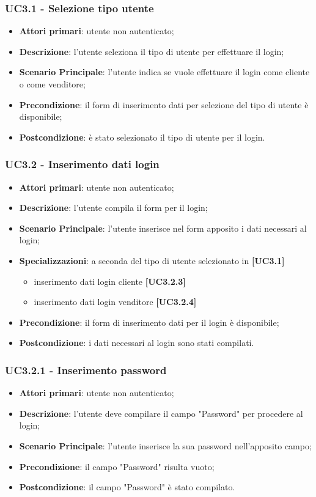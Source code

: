 \subsubsection{UC3.1 - Selezione tipo utente}
\begin{itemize}
\item \textbf{Attori primari}: utente non autenticato;
\item \textbf{Descrizione}: l'utente seleziona il tipo di utente per effettuare il login;
\item \textbf{Scenario Principale}: l'utente indica se vuole effettuare il login come cliente o come venditore;
\item \textbf{Precondizione}: il form di inserimento dati per selezione del tipo di utente è disponibile;
\item \textbf{Postcondizione}: è stato selezionato il tipo di utente per il login.
\end{itemize}

\subsubsection{UC3.2 - Inserimento dati login}
\begin{itemize}
\item \textbf{Attori primari}: utente non autenticato;
\item \textbf{Descrizione}: l'utente compila il form per il login;
\item \textbf{Scenario Principale}: l'utente inserisce nel form apposito i dati necessari al login;
\item \textbf{Specializzazioni}: a seconda del tipo di utente selezionato in \textbf{[UC3.1]}
\begin{itemize}
	\item inserimento dati login cliente \textbf{[UC3.2.3]}
	\item inserimento dati login venditore \textbf{[UC3.2.4]}
\end{itemize}
\item \textbf{Precondizione}: il form di inserimento dati per il login è disponibile;
\item \textbf{Postcondizione}: i dati necessari al login sono stati compilati.
\end{itemize}

\subsubsection{UC3.2.1 - Inserimento password}
\begin{itemize}
\item \textbf{Attori primari}: utente non autenticato;
\item \textbf{Descrizione}: l'utente deve compilare il campo "Password" per procedere al login;
\item \textbf{Scenario Principale}: l'utente inserisce la sua password nell'apposito campo;
\item \textbf{Precondizione}: il campo "Password" risulta vuoto;
\item \textbf{Postcondizione}: il campo "Password" è stato compilato.
\end{itemize}

